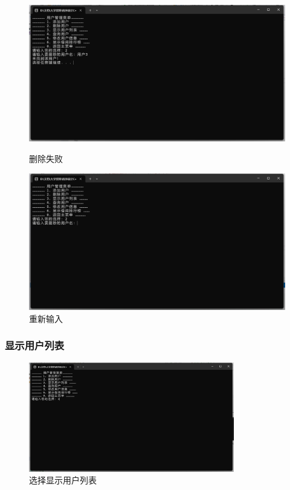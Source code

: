 \documentclass[12pt,twoside]{ctexart}
\begin{document}
\begin{figure}[H]
    \begin{minipage}[c]{0.48\textwidth}
        \centering
        \includegraphics[width=\textwidth]{deleteuserfail.png}
        \caption{删除失败}
        \label{fig:DeleteFailed}
    \end{minipage}
    \hfill
    \begin{minipage}[c]{0.48\textwidth}
        \centering
        \includegraphics[width=\textwidth]{Deleteuser.png}
        \caption{重新输入}
        \label{fig:DeleteAgain}
    \end{minipage}
\end{figure}

\subsubsection{显示用户列表}

\begin{figure}[H]
    \centering
    \includegraphics[width=0.8\textwidth]{selectuserlist.png}
    \caption{选择显示用户列表}
\end{figure}
\end{document}
